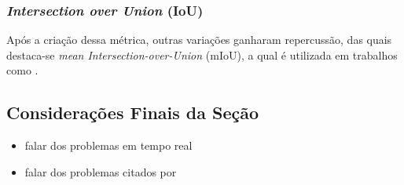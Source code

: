 \subsubsection{\textit{Intersection over Union} (IoU)}
\label{semantic:IoU}

Após a criação dessa métrica, outras variações ganharam repercussão, das quais destaca-se \textit{mean Intersection-over-Union} (mIoU), a qual é utilizada em trabalhos como \cite{Mohan2020}.


\subsection{Considerações Finais da Seção}
\begin{itemize}
    \item falar dos problemas em tempo real \cite{Yu2018}
    \item falar dos problemas citados por \cite{Kirillov2019a}
\end{itemize}

